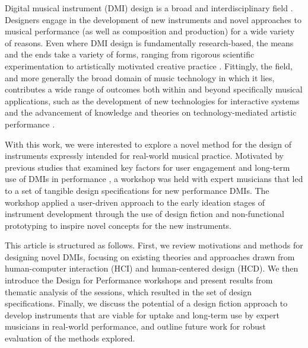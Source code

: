 \documentclass[letterpaper, 12pt]{article}
\begin{document}


Digital musical instrument (DMI) design is a broad and interdisciplinary field \citep{Miranda2006a}. Designers engage in the development of new instruments and novel approaches to musical performance (as well as composition and production) for a wide variety of reasons. Even where DMI design is fundamentally research-based, the means and the ends take a variety of forms, ranging from rigorous scientific experimentation to artistically motivated creative practice \citep{Gurevich2016}. Fittingly, the field, and more generally the broad domain of music technology in which it lies, contributes a wide range of outcomes both within and beyond specifically musical applications, such as the development of new technologies for interactive systems \citep{malloch2018generalized} and the advancement of knowledge and theories on technology-mediated artistic performance \citep{Tahlroglu2020}. 

With this work, we were interested to explore a novel method for the design of instruments expressly intended for real-world musical practice. Motivated by previous studies that examined key factors for user engagement \citep{OBrien2008} and long-term use of DMIs in performance \citep[\emph{reference removed for anonymity} (forthcoming), ][]{Wallis2013}, a workshop was held with expert musicians that led to a set of tangible design specifications for new performance DMIs. The workshop applied a user-driven approach to the early ideation stages of instrument development through the use of design fiction \citep{Blythe2014} and non-functional prototyping \citep{Pigrem2018} to inspire novel concepts for the new instruments. 

This article is structured as follows. First, we review motivations and methods for designing novel DMIs, focusing on existing theories and approaches drawn from human-computer interaction (HCI) and human-centered design (HCD). We then introduce the Design for Performance workshops and present results from thematic analysis of the sessions, which resulted in the set of design specifications. Finally, we discuss the potential of a design fiction approach to develop instruments that are viable for uptake and long-term use by expert musicians in real-world performance, and outline future work for robust evaluation of the methods explored.
\end{document}

